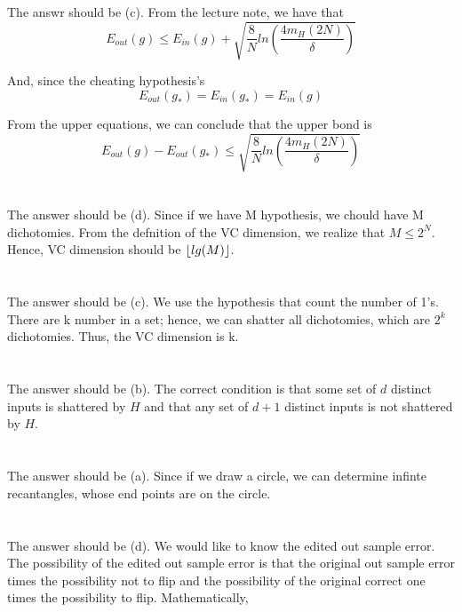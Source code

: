\documentclass{article}
\DeclarePairedDelimiter\floor{\lfloor}{\rfloor}
\begin{document}
\begin{CJK*}{UTF8}{bsmi}
\section{}%
The answr should be (c). From the lecture note, we have that 
\begin{displaymath} 
	E_{out}(g) \leq E_{in}(g) + \sqrt{\frac{8}{N}ln(\frac{4m_H(2N)}{\delta})}
\end{displaymath}  

And, since the cheating hypothesis's
\begin{displaymath} 
	E_{out}(g_*) = E_{in}(g_*) = E_{in}(g)
\end{displaymath}  

From the upper equations, we can conclude that the upper bond is
\begin{displaymath} 
	E_{out}(g) - E_{out}(g_*) \leq \sqrt{\frac{8}{N}ln(\frac{4m_H(2N)}{\delta})}
\end{displaymath}  


\section{}%
The answer should be (d). Since if we have M hypothesis, we chould have M dichotomies. From the defnition of the VC dimension, we realize that $M \leq 2^N$. Hence, VC dimension should be $\floor{lg(M)}$. 

\section{}%
The answer should be (c). We use the hypothesis that count the number of 1's. There are k number in a set; hence, we can shatter all dichotomies, which  are $2^k$ dichotomies. Thus, the VC dimension is k.

\section{}%
The answer should be (b). The correct condition is that some set of $d$ distinct inputs is shattered by $H$ and that  any set of $d + 1$ distinct inputs is not shattered by $H$.

\section{}%
The answer should be (a). Since if we draw a circle, we can determine infinte recantangles, whose end points are on the circle.

\section{}%
The answer should be (d). We would like to know the edited out sample error. The possibility of the edited out sample error is that the original out sample error times the possibility not to flip and the possibility of the original correct one times the possibility to flip. Mathematically,  


\end{CJK*}
\end{document}
